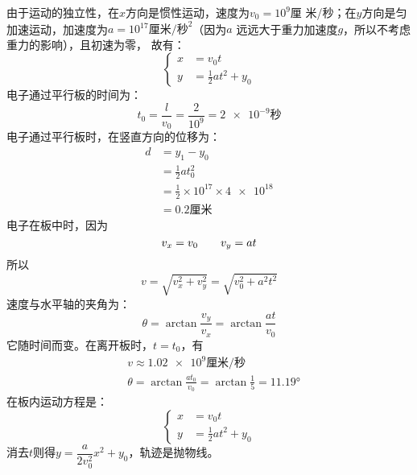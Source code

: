 由于运动的独立性，在$x$方向是惯性运动，速度为$v_0=10^9$厘
米/秒；在$y$方向是匀加速运动，加速度为$a=10^{17}\text{厘米/秒}^2$（因为$a$
远远大于重力加速度$g$，所以不考虑重力的影响），且初速为零，
故有：
\begin{equation*}
    \left\lbrace \begin{aligned}
        x&=v_0 t \\
        y&=\frac{1}{2}at^2+y_0
    \end{aligned}\right.
\end{equation*}
电子通过平行板的时间为：
\begin{equation*}
    t_0=\frac{l}{v_0}=\frac{2}{10^{9}}=\num{2e-9}\text{秒}
\end{equation*}
电子通过平行板时，在竖直方向的位移为：
\begin{align*}
    d&=y_1-y_0 \\
     &=\frac{1}{2}at_0^2 \\
     &=\frac{1}{2}\times 10^{17} \times \num{4e18} \\
     &=0.2\text{厘米}
\end{align*}
电子在板中时，因为
\begin{equation*}
        v_x=v_0 \qquad v_y=at \\
\end{equation*}
所以
\begin{equation*}
        v=\sqrt{v_x^2+v_y^2}=\sqrt{v_0^2 + a^2 t^2}
\end{equation*}
速度与水平轴的夹角为：
\begin{equation*}
    \theta = \arctan\frac{v_y}{v_x} = \arctan\frac{at}{v_0}
\end{equation*}
它随时间而变。在离开板时，$t=t_0$，有
\begin{align*}
    &v \approx \num{1.02e9}\text{厘米/秒} \\
    &\theta = \arctan\frac{at_0}{v_0} =\arctan\frac 1 5=\ang{11,19}
\end{align*}
在板内运动方程是：
\begin{equation*}
    \left\lbrace \begin{aligned}
        x&=v_0 t \\
        y&=\frac{1}{2}at^2+y_0
    \end{aligned}\right.
\end{equation*}
消去$t$则得$y=\dfrac{a}{2v_0^2}x^2+y_0$，轨迹是抛物线。

